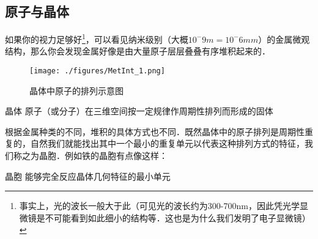 
\subsection{原子与晶体}
如果你的视力足够好\footnote{事实上，光的波长一般大于此（可见光的波长约为300-700nm，因此凭光学显微镜是不可能看到如此细小的结构等．这也是为什么我们发明了电子显微镜）}，可以看见纳米级别（大概$10^-9m =10^-6 mm$）的金属微观结构，那么你会发现金属好像是由大量原子层层叠叠有序堆积起来的．

\begin{figure}[ht]
\centering
\texttt{[image: ./figures/MetInt\_1.png]}
\caption{晶体中原子的排列示意图} \label{MetInt_fig1}
\end{figure}

\begin{definition}{晶体}
原子（或分子）在三维空间按一定规律作周期性排列而形成的固体
\end{definition}

根据金属种类的不同，堆积的具体方式也不同．既然晶体中的原子排列是周期性重复的，自然我们就能找出其中一个最小的重复单元以代表这种排列方式的特征，我们称之为晶胞．例如铁的晶胞有点像这样：
\begin{definition}{晶胞}
能够完全反应晶体几何特征的最小单元
\end{definition}
